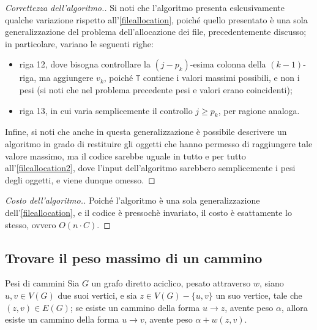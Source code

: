 \documentclass[a4paper, 12pt]{report}
\begin{document}
    \begin{proof}[Correttezza dell'algoritmo.]
        Si noti che l'algoritmo presenta eslcusivamente qualche variazione rispetto all'\cref{fileallocation}, poiché quello presentato è una sola generalizzazione del problema dell'allocazione dei file, precedentemente discusso; in particolare, variano le seguenti righe:

        \begin{itemize}
            \item riga 12, dove bisogna controllare la $(j - p_k)$-esima colonna della $(k -1)$-riga, ma aggiungere $v_k$, poiché \texttt{T} contiene i valori massimi possibili, e non i pesi (si noti che nel problema precedente pesi e valori erano coincidenti);
            \item riga 13, in cui varia semplicemente il controllo $j \ge p_k$, per ragione analoga.
        \end{itemize}

        Infine, si noti che anche in questa generalizzazione è possibile descrivere un algoritmo in grado di restituire gli oggetti che hanno permesso di raggiungere tale valore massimo, ma il codice sarebbe uguale in tutto e per tutto all'\cref{fileallocation2}, dove l'input dell'algoritmo sarebbero semplicemente i pesi degli oggetti, e viene dunque omesso.
    \end{proof}

    \begin{proof}[Costo dell'algoritmo.]
        Poiché l'algoritmo è una sola generalizzazione dell'\cref{fileallocation}, e il codice è pressochè invariato, il costo è esattamente lo stesso, ovvero $O(n \cdot C)$.
    \end{proof}

    \subsection{Trovare il peso massimo di un cammino}

    \begin{framedlem}[label={lemma grafi max}]{Pesi di cammini}
        Sia $G$ un grafo diretto aciclico, pesato attraverso $w$, siano $u, v \in V(G)$ due suoi vertici, e sia $z \in V(G) - \{u, v\}$ un suo vertice, tale che $(z, v) \in E(G)$; se esiste un cammino della forma $u \rightarrow z$, avente peso $\alpha$, allora esiste un cammino della forma $u \rightarrow v$, avente peso $\alpha + w(z, v)$.
    \end{framedlem}
\end{document}
